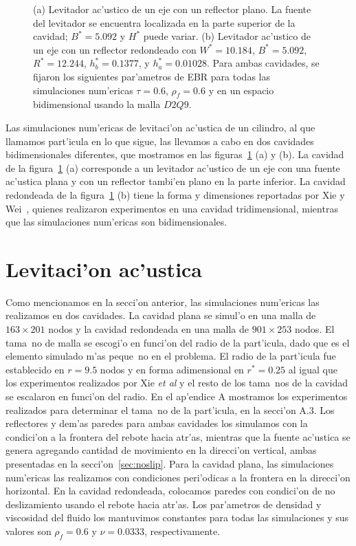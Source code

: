 \begin{figure} 

\caption{\label{fig:cavidades}
(a) Levitador ac'ustico de un eje con un reflector plano. La fuente del levitador se encuentra
localizada en la parte superior de la cavidad; $B^\ast= 5.092$  y $H^\ast$ puede variar. 
(b) Levitador ac'ustico de un eje con un reflector redondeado con 
$W^\ast=10.184$, $B^\ast=5.092$, $R^\ast=12.244$, $h_b^\ast =0.1377$, 
y $h_a^\ast=0.01028$. Para ambas cavidades, se fijaron los siguientes par'ametros de EBR para 
todas las simulaciones num'ericas $\tau=0.6$, $\rho_f=0.6$ y en un espacio bidimensional usando la malla $D2Q9$.}
\end{figure}
Las simulaciones num'ericas de levitaci'on ac'ustica de un cilindro, al que 
llamamos  part'icula   en lo que sigue, las llevamos  a cabo en dos
cavidades bidimensionales diferentes, que mostramos en las figuras~\ref{fig:cavidades} (a) y (b). 
La cavidad de la figura~\ref{fig:cavidades} (a)
corresponde a un levitador ac'ustico de un eje  con una fuente ac'ustica plana y con un reflector tambi'en  
plano en la parte inferior.
La cavidad redondeada de la figura~\ref{fig:cavidades} (b) tiene la forma y dimensiones reportadas
por Xie y Wei~\cite{xie01}, quienes realizaron experimentos en una cavidad tridimensional, 
mientras que las simulaciones num'ericas son bidimensionales.


\section{Levitaci'on ac'ustica}
\label{sec:simulaciones}

Como mencionamos en la secci'on anterior, las simulaciones num'ericas las realizamos en dos
cavidades. La cavidad plana se simul'o en una malla de  $163 \times 201$ nodos y 
la cavidad redondeada en una malla de $901 \times 253$ nodos. El tama~no de malla se
escogi'o en funci'on del radio de la part'icula, dado que es el elemento simulado  m'as peque~no
en el problema. El radio de la part'icula fue establecido en $r=9.5$ nodos y en forma adimensional
en $r^\ast=0.25$ al igual que los experimentos realizados 
por Xie {\it et al} y el resto de los tama~nos de la cavidad se escalaron en funci'on del radio. 
En el ap'endice A  mostramos los experimentos realizados para determinar el tama~no de la part'icula,
en la secci'on A.3. 
Los reflectores  y dem'as paredes para ambas cavidades los simulamos con la
condici'on a la frontera del rebote hacia atr'as, mientras que 
la fuente ac'ustica se genera agregando cantidad de movimiento en la direcci'on vertical, ambas
presentadas en la secci'on~\ref{sec:noslip}. Para la cavidad
plana, las simulaciones num'ericas las realizamos con condiciones peri'odicas a la frontera en la direcci'on
horizontal. En la cavidad redondeada, colocamos paredes con condici'on de no deslizamiento usando el rebote
hacia atr'as. Los par'ametros de densidad y viscosidad del fluido los mantuvimos constantes para 
todas las simulaciones y sus valores son $\rho_f=0.6$ y $\nu=0.0333$, respectivamente. 

